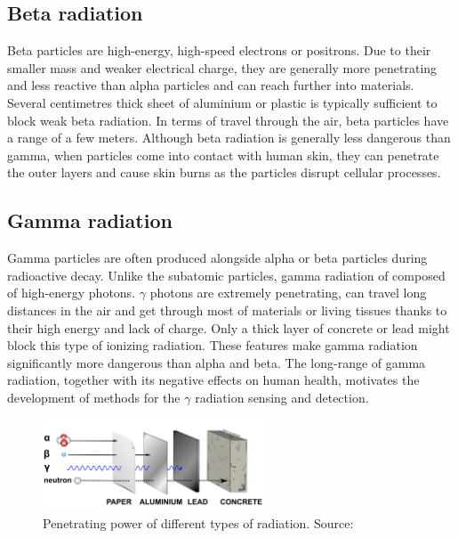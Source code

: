 \subsection{Beta radiation}
Beta particles are high-energy, high-speed electrons or positrons.
Due to their smaller mass and weaker electrical charge, they are generally more penetrating and less reactive than alpha particles and can reach further into materials.
Several centimetres thick sheet of aluminium or plastic is typically sufficient to block weak beta radiation.
In terms of travel through the air, beta particles have a range of a few meters.
Although beta radiation is generally less dangerous than gamma, when particles come into contact with human skin, they can penetrate the outer layers and cause skin burns as the particles disrupt cellular processes.

\subsection{Gamma radiation}
Gamma particles are often produced alongside alpha or beta particles during radioactive decay. 
Unlike the subatomic particles, gamma radiation of composed of high-energy photons. 
$\gamma$ photons are extremely penetrating, can travel long distances in the air and get through most of materials or living tissues thanks to their high energy and lack of charge.
Only a thick layer of concrete or lead might block this type of ionizing radiation.
These features make gamma radiation significantly more dangerous than alpha and beta.
The long-range of gamma radiation, together with its negative effects on human health, motivates the development of methods for the $\gamma$ radiation sensing and detection.
  \begin{figure}[!h]
    \centering
      \includegraphics[width=0.6\textwidth]{./fig/photos/pene2.png}
    \caption{Penetrating power of different types of radiation. Source: \cite{penetrating_power}}
  \end{figure}

